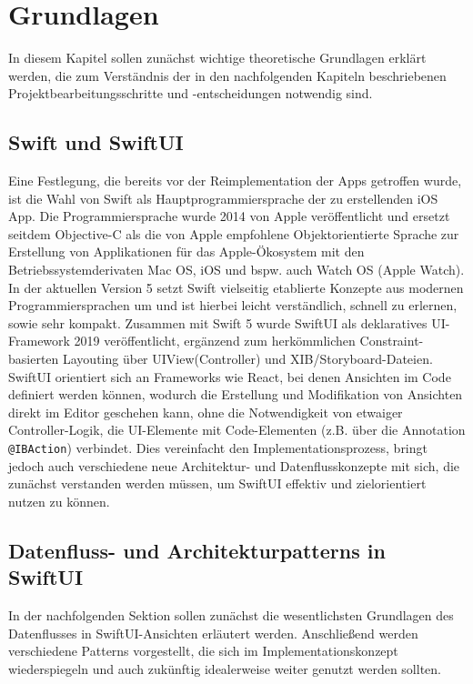 \chapter{Grundlagen}\label{ch:grundlagen}

In diesem Kapitel sollen zunächst wichtige theoretische Grundlagen erklärt werden, die zum Verständnis der in den nachfolgenden Kapiteln beschriebenen Projektbearbeitungsschritte und -entscheidungen notwendig sind.

\section{Swift und SwiftUI}

Eine Festlegung, die bereits vor der Reimplementation der Apps getroffen wurde, ist die Wahl von Swift als Hauptprogrammiersprache der zu erstellenden iOS App. Die Programmiersprache wurde 2014 von Apple veröffentlicht und ersetzt seitdem Objective-C als die von Apple empfohlene Objektorientierte Sprache zur Erstellung von Applikationen für das Apple-Ökosystem mit den Betriebssystemderivaten Mac OS, iOS und bspw. auch Watch OS (Apple Watch). In der aktuellen Version 5 setzt Swift vielseitig etablierte Konzepte aus modernen Programmiersprachen um und ist hierbei leicht verständlich, schnell zu erlernen, sowie sehr kompakt. Zusammen mit Swift 5 wurde SwiftUI als deklaratives UI-Framework 2019 veröffentlicht, ergänzend zum herkömmlichen Constraint-basierten Layouting über UIView(Controller) und XIB/Storyboard-Dateien. SwiftUI orientiert sich an Frameworks wie React, bei denen Ansichten im Code definiert werden können, wodurch die Erstellung und Modifikation von Ansichten direkt im Editor geschehen kann, ohne die Notwendigkeit von etwaiger Controller-Logik, die UI-Elemente mit Code-Elementen (z.B. über die Annotation \texttt{@IBAction}) verbindet. Dies vereinfacht den Implementationsprozess, bringt jedoch auch verschiedene neue Architektur- und Datenflusskonzepte mit sich, die zunächst verstanden werden müssen, um SwiftUI effektiv und zielorientiert nutzen zu können.

\section{Datenfluss- und Architekturpatterns in SwiftUI}

In der nachfolgenden Sektion sollen zunächst die wesentlichsten Grundlagen des Datenflusses in SwiftUI-Ansichten erläutert werden. Anschließend werden verschiedene Patterns vorgestellt, die sich im Implementationskonzept wiederspiegeln und auch zukünftig idealerweise weiter genutzt werden sollten.

